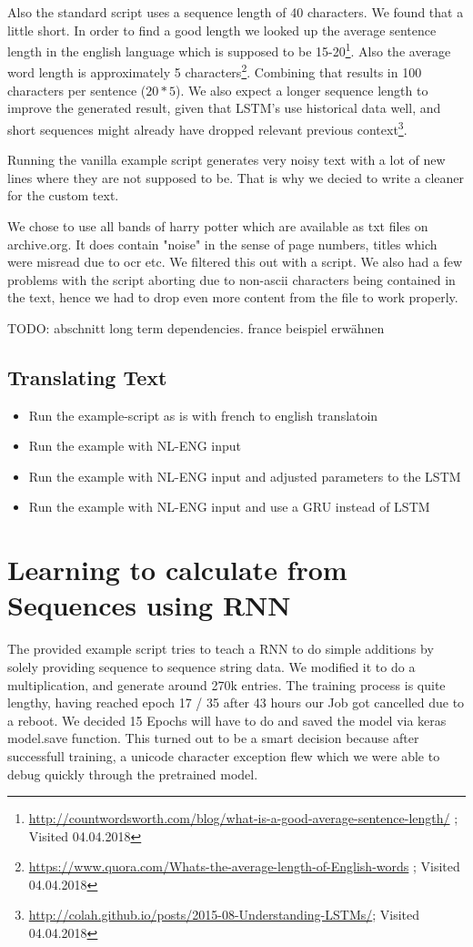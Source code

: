 \documentclass{article}
\begin{document}
Also the standard script uses a sequence length of 40 characters. We found that a little short. In order to find a good length we looked up the average sentence length in the english language which is supposed to be 15-20\footnote{\url{http://countwordsworth.com/blog/what-is-a-good-average-sentence-length/} ; Visited 04.04.2018}.
Also the average word length is approximately 5 characters\footnote{\url{https://www.quora.com/Whats-the-average-length-of-English-words} ; Visited 04.04.2018}. Combining that results in 100 characters per sentence ($20 * 5$). We also expect a longer sequence length to improve the generated result, given that LSTM's use historical data well, and short sequences might already have dropped relevant previous context\footnote{\url{http://colah.github.io/posts/2015-08-Understanding-LSTMs/}; Visited 04.04.2018}.

Running the vanilla example script generates very noisy text with a lot of new lines where they are not supposed to be. That is why we decied to write a cleaner for the custom text.

We chose to use all bands of harry potter which are available as txt files on archive.org.
It does contain "noise" in the sense of page numbers, titles which were misread due to ocr etc. We filtered this out with a script.
We also had a few problems with the script aborting due to non-ascii characters being contained in the text, hence we had to drop even more content from the file to work properly.

TODO: abschnitt long term dependencies. france beispiel erwähnen

\subsection{Translating Text}
\label{sec:trans}
\begin{itemize}
\item{Run the example-script as is with french to english translatoin}
\item{Run the example with NL-ENG input}
\item{Run the example with NL-ENG input and adjusted parameters to the LSTM}
\item{Run the example with NL-ENG input and use a GRU instead of LSTM}
\end{itemize}

\section{Learning to calculate from Sequences using RNN}
\label{sec:rnn}


The provided example script tries to teach a RNN to do simple additions by solely providing sequence to sequence string data.
We modified it to do a multiplication, and generate around 270k entries. The training process is quite lengthy, having reached epoch 17 / 35 after 43 hours our Job got cancelled due to a reboot.
We decided 15 Epochs will have to do and saved the model via keras model.save function. This turned out to be a smart decision because after successfull training, a unicode character exception flew which we were able to debug quickly through the pretrained model.
\end{document}
